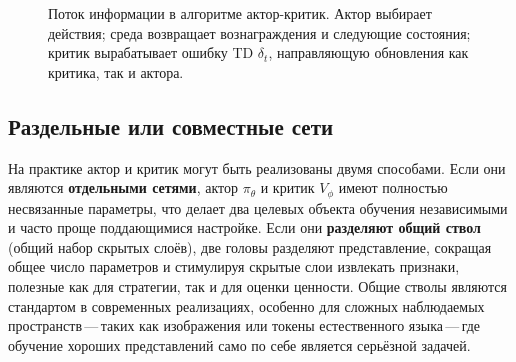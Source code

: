 \begin{figure}[ht]
\centering
{}
\caption{Поток информации в алгоритме актор-критик. Актор выбирает действия; среда возвращает вознаграждения и следующие состояния; критик вырабатывает ошибку TD $\delta_t$, направляющую обновления как критика, так и актора.}
\label{fig:actor-critic-diagram}
\end{figure}

\subsection{Раздельные или совместные сети}

На практике актор и критик могут быть реализованы двумя способами. Если они являются \textbf{отдельными сетями}, актор $\pi_\theta$ и критик $V_\phi$ имеют полностью несвязанные параметры, что делает два целевых объекта обучения независимыми и часто проще поддающимися настройке. Если они \textbf{разделяют общий ствол} (общий набор скрытых слоёв), две головы разделяют представление, сокращая общее число параметров и стимулируя скрытые слои извлекать признаки, полезные как для стратегии, так и для оценки ценности. Общие стволы являются стандартом в современных реализациях, особенно для сложных наблюдаемых пространств\,---\,таких как изображения или токены естественного языка\,---\,где обучение хороших представлений само по себе является серьёзной задачей.

